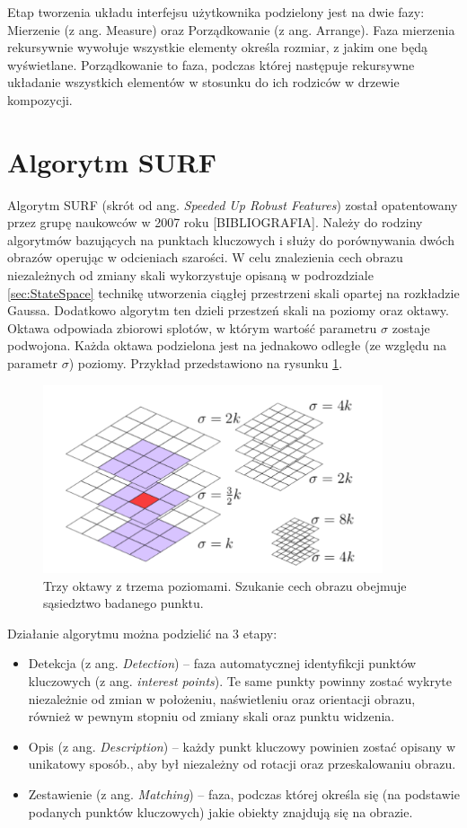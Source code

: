 Etap tworzenia układu interfejsu użytkownika podzielony jest na dwie fazy: Mierzenie (z ang. Measure) oraz Porządkowanie (z ang. Arrange). Faza mierzenia rekursywnie wywołuje wszystkie elementy określa rozmiar, z jakim one będą wyświetlane. Porządkowanie to faza, podczas której następuje rekursywne układanie wszystkich elementów w stosunku do ich rodziców w drzewie kompozycji. 


\section{Algorytm SURF}
Algorytm SURF (skrót od ang. \textit{Speeded Up Robust Features}) został opatentowany przez grupę naukowców w 2007 roku [BIBLIOGRAFIA]. Należy do rodziny algorytmów bazujących na punktach kluczowych i służy do porównywania dwóch obrazów operując w odcieniach szarości. W celu znalezienia cech obrazu niezależnych od zmiany skali wykorzystuje opisaną w podrozdziale \ref{sec:StateSpace} technikę utworzenia ciągłej przestrzeni skali opartej na rozkładzie Gaussa. Dodatkowo algorytm ten dzieli przestzeń skali na poziomy oraz oktawy. Oktawa odpowiada zbiorowi splotów, w którym wartość parametru $\sigma$ zostaje podwojona. Każda oktawa podzielona jest na jednakowo odległe (ze względu na parametr $\sigma$) poziomy. Przykład przedstawiono na rysunku \ref{im: OctavesAndLevels}.
\begin{figure}[h]
	\includegraphics[width=10cm]{OctavesAndLevels}
	\centering
	\caption{Trzy oktawy z trzema poziomami. Szukanie cech obrazu obejmuje sąsiedztwo badanego punktu.}
	\label{im: OctavesAndLevels}
\end{figure}

Działanie algorytmu można podzielić na 3 etapy:

\begin{itemize}
	\item Detekcja (z ang. \textit{Detection}) – faza automatycznej identyfikcji punktów kluczowych (z ang. \textit{interest points}). Te same punkty powinny zostać wykryte niezależnie od zmian w położeniu, naświetleniu oraz orientacji obrazu, również w pewnym stopniu od zmiany skali oraz punktu widzenia. 
	\item Opis (z ang. \textit{Description}) – każdy punkt kluczowy powinien zostać opisany w unikatowy sposób., aby był niezależny od rotacji oraz przeskalowaniu obrazu.
	\item Zestawienie (z ang. \textit{Matching}) – faza, podczas której określa się (na podstawie podanych punktów kluczowych) jakie obiekty znajdują się na obrazie. 
\end{itemize}

